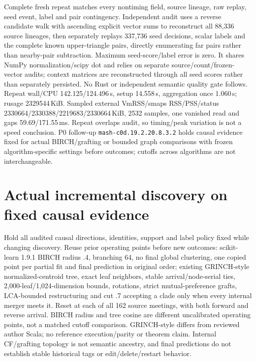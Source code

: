 \documentclass[11pt]{article}
\begin{document}
Complete fresh repeat matches every nontiming field, source lineage, raw replay,
seed event, label and pair contingency. Independent audit uses a reverse candidate
walk with ascending explicit vector sums to reconstruct all 88,336 source
lineages, then separately replays 337,736 seed decisions, scalar labels and the
complete known upper-triangle pairs, directly enumerating far pairs rather than
nearby-pair subtraction. Maximum seed-score/label error is zero. It shares NumPy
normalization/scipy dot and relies on separate source/count/frozen-vector audits;
context matrices are reconstructed through all seed scores rather than separately
persisted. No Rust or independent semantic quality gate follows. Repeat wall/CPU
142.125/124.496\,s, setup 14.558\,s, aggregation once 1.060\,s; rusage
2329544\,KiB. Sampled external VmRSS/smaps RSS/PSS/status
2330664/2330388/2219683/2330664\,KiB, 2532 samples, one vanished read and gaps
59.69/171.55\,ms. Repeat overlaps audit, so timing/peak variation is not a speed
conclusion. P0 follow-up \texttt{mash-c0d.19.2.20.8.3.2} holds causal evidence
fixed for actual BIRCH/grafting or bounded graph comparisons with frozen
algorithm-specific settings before outcomes; cutoffs across algorithms are not
interchangeable.

\section{Actual incremental discovery on fixed causal evidence}
Hold all audited causal directions, identities, support and label policy fixed
while changing discovery. Reuse prior operating points before new outcomes:
scikit-learn 1.9.1 BIRCH radius .4, branching 64, no final global clustering,
one copied point per partial fit and final prediction in original order;
existing GRINCH-style normalized-centroid tree, exact leaf neighbors, stable
arrival/node-serial ties, 2,000-leaf/1,024-dimension bounds, rotations, strict
mutual-preference grafts, LCA-bounded restructuring and cut .7 accepting a clade
only when every internal merger meets it. Reset at each of all 162 source meetings,
with both forward and reverse arrival. BIRCH radius and tree cosine are different
uncalibrated operating points, not a matched cutoff comparison. GRINCH-style
differs from reviewed author Scala; no reference execution/parity or theorem claim.
Internal CF/grafting topology is not semantic ancestry, and final predictions do
not establish stable historical tags or edit/delete/restart behavior.
\end{document}
